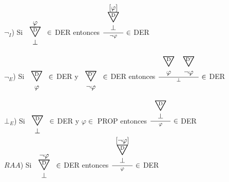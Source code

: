\documentclass[a4paper,12pt]{article}
\newcommand\triang{\scaleobj{2}{\bigtriangledown}}
\newcommand\triangulo[3][]{\begin{array}{c} \vspace{-1.5mm} #1 \\ \ooalign{\triang\cr\hss\raisebox{0.8ex}{\scriptsize #2}\hss}\vspace{1mm} \\ #3 \end{array}
}
\begin{document}
$\neg_I$) Si $\triangulo[\varphi]{D}{\bot} \in$ DER entonces $\frac{\triangulo[{[\varphi]}]{D}{\bot}}{\neg\varphi} \in$ DER \\
$\neg_E$) Si $\triangulo{D}{\varphi} \in$ DER y $\triangulo{D'}{\neg\varphi} \in$ DER entonces $\frac{\triangulo{D}{\varphi} \triangulo{D'}{\neg\varphi}}{\bot} \in$ DER \\
$\bot_E$) Si $\triangulo{D}{\bot} \in$ DER y $\varphi \in$ PROP entonces $\frac{\triangulo{D}{\bot}}{\varphi} \in$ DER \\
$RAA$) Si $\triangulo[\neg\varphi]{D}{\bot} \in$ DER entonces $\frac{\triangulo[{[\neg\varphi]}]{D}{\bot}}{\varphi} \in$ DER
\end{document}
